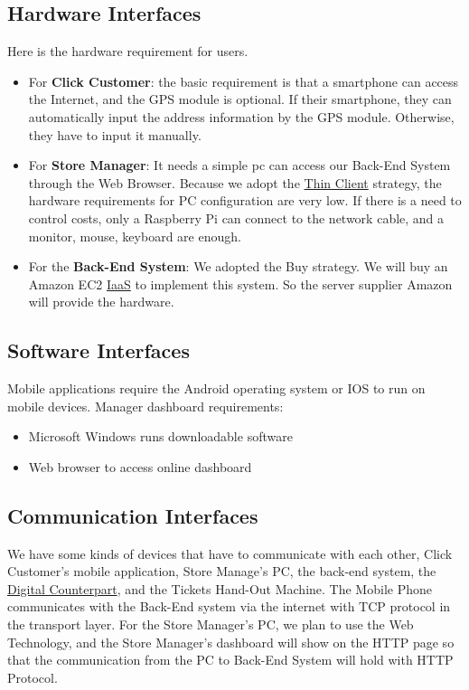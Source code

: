 \documentclass[a4paper,12pt]{report}
\begin{document}
\subsection{Hardware Interfaces}
Here is the hardware requirement for users.
\begin{itemize}
	\item For \textbf{Click Customer}: the basic requirement is that a smartphone can access the Internet, and the GPS module is optional. If their smartphone, they can automatically input the address information by the GPS module. Otherwise, they have to input it manually.
	\item For \textbf{Store Manager}: It needs a simple pc can access our Back-End System through the Web Browser. Because we adopt the \hyperref[Reference documents]{Thin Client} strategy, the hardware requirements for PC configuration are very low.
	If there is a need to control costs, only a Raspberry Pi can connect to the network cable, and a monitor, mouse, keyboard are enough.
	\item For the \textbf{Back-End System}: We adopted the Buy strategy. We will buy an Amazon EC2 \hyperref[Reference documents]{IaaS} to implement this system. So the server supplier Amazon will provide the hardware.
\end{itemize}



\subsection{Software  Interfaces}
Mobile applications require the Android operating system or IOS to run on mobile devices.
Manager dashboard requirements:
\begin{itemize}
	\item Microsoft Windows runs downloadable software
	\item Web browser to access online dashboard
\end{itemize}


\subsection{Communication Interfaces}

We have some kinds of devices that have to communicate with each other, Click Customer's mobile application, Store Manage's PC, the back-end system, the \hyperref[Definitions]{Digital Counterpart}, and the Tickets Hand-Out Machine. The Mobile Phone communicates with the Back-End system via the internet with TCP protocol in the transport layer. For the Store Manager's PC, we plan to use the Web Technology, and the Store Manager's dashboard will show on the HTTP page so that the communication from the PC to Back-End System will hold with HTTP Protocol.
\end{document}
